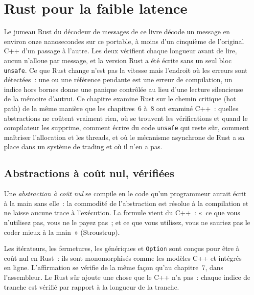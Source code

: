 \chapter{Rust pour la faible latence}\label{ch:ll:rust-for-low-latency}

Le jumeau Rust du décodeur de messages de ce livre décode un message en environ onze nanosecondes sur ce portable, à moins d'un cinquième
de l'original C++ d'un passage à l'autre. Les deux vérifient chaque longueur avant de lire, aucun n'alloue par message, et la
version Rust a été écrite sans un seul bloc \texttt{unsafe}. Ce que Rust change n'est pas la vitesse mais l'endroit où les erreurs
sont détectées~: une  ou une référence pendante est une erreur de compilation, un indice hors bornes donne une panique
contrôlée au lieu d'une lecture silencieuse de la mémoire d'autrui. Ce chapitre examine Rust sur le chemin critique (hot path) de la
même manière que les chapitres~6 à~8 ont examiné C++~: quelles abstractions ne coûtent vraiment rien, où se trouvent les
vérifications et quand le compilateur les supprime, comment écrire du code \texttt{unsafe} qui reste sûr, comment maîtriser
l'allocation et les threads, et où le mécanisme asynchrone de Rust a sa place dans un système de trading et où il n'en a pas.

\section{Abstractions à coût nul, vérifiées}

\begin{definition}\label{def:ll:rust-for-low-latency:zero}
Une \emph{abstraction à coût nul} se compile en le code qu'un programmeur aurait écrit à la main
sans elle~: la commodité de l'abstraction est résolue à la compilation et ne laisse aucune trace à l'exécution. La formule vient
du C++~: «~ce que vous n'utilisez pas, vous ne le payez pas~; et ce que vous utilisez, vous ne sauriez pas le coder mieux à la main~»
(Stroustrup).
\end{definition}

Les itérateurs, les fermetures, les génériques et \texttt{Option} sont conçus pour être à coût nul en Rust~: ils sont monomorphisés comme
les modèles C++ et intégrés en ligne. L'affirmation se vérifie de la même façon qu'au chapitre~7, dans l'assembleur. Le Rust sûr ajoute
une chose que le C++ n'a pas~: chaque indice de tranche est vérifié par rapport à la longueur de la tranche.

